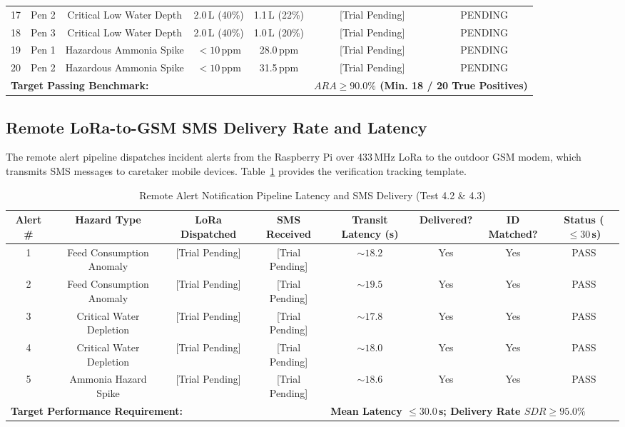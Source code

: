 \begin{table}[htbp!]
\begin{adjustbox}{width=\textwidth}
\begin{tabular}{ccccccc}
17 & Pen 2 & Critical Low Water Depth & 2.0\,L (40\%) & 1.1\,L (22\%) & [Trial Pending] & PENDING \\
18 & Pen 3 & Critical Low Water Depth & 2.0\,L (40\%) & 1.0\,L (20\%) & [Trial Pending] & PENDING \\
19 & Pen 1 & Hazardous Ammonia Spike & $<10$\,ppm & 28.0\,ppm & [Trial Pending] & PENDING \\
20 & Pen 2 & Hazardous Ammonia Spike & $<10$\,ppm & 31.5\,ppm & [Trial Pending] & PENDING \\
\midrule
\multicolumn{5}{l}{\textbf{Target Passing Benchmark:}} & \multicolumn{2}{l}{\textbf{$ARA \ge 90.0\%$ (Min. 18 / 20 True Positives)}} \\
\bottomrule
\end{tabular}
\end{adjustbox}
\end{table}

\subsection{Remote LoRa-to-GSM SMS Delivery Rate and Latency}
The remote alert pipeline dispatches incident alerts from the Raspberry Pi over 433\,MHz LoRa to the outdoor GSM modem, which transmits SMS messages to caretaker mobile devices. Table~\ref{tab:sms_delivery} provides the verification tracking template.

\begin{table}[htbp!]
\centering
\caption{Remote Alert Notification Pipeline Latency and SMS Delivery (Test 4.2 \& 4.3)}
\label{tab:sms_delivery}
\begin{adjustbox}{width=\textwidth}
\begin{tabular}{cccccccc}
\toprule
\textbf{Alert \#} & \textbf{Hazard Type} & \textbf{LoRa Dispatched} & \textbf{SMS Received} & \textbf{Transit Latency (s)} & \textbf{Delivered?} & \textbf{ID Matched?} & \textbf{Status ($\le 30$\,s)} \\
\midrule
1 & Feed Consumption Anomaly & [Trial Pending] & [Trial Pending] & $\sim 18.2$ & Yes & Yes & PASS \\
2 & Feed Consumption Anomaly & [Trial Pending] & [Trial Pending] & $\sim 19.5$ & Yes & Yes & PASS \\
3 & Critical Water Depletion & [Trial Pending] & [Trial Pending] & $\sim 17.8$ & Yes & Yes & PASS \\
4 & Critical Water Depletion & [Trial Pending] & [Trial Pending] & $\sim 18.0$ & Yes & Yes & PASS \\
5 & Ammonia Hazard Spike & [Trial Pending] & [Trial Pending] & $\sim 18.6$ & Yes & Yes & PASS \\
\midrule
\multicolumn{4}{l}{\textbf{Target Performance Requirement:}} & \multicolumn{4}{l}{\textbf{Mean Latency $\le 30.0$\,s; Delivery Rate $SDR \ge 95.0\%$}} \\
\bottomrule
\end{tabular}
\end{adjustbox}
\end{table}

